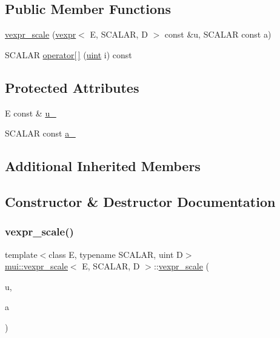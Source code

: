 \subsection*{Public Member Functions}
\begin{DoxyCompactItemize}
\item 
\hyperlink{structmui_1_1vexpr__scale_a4d10acba01d51494bbc974f0444f6ae1}{vexpr\+\_\+scale} (\hyperlink{structmui_1_1vexpr}{vexpr}$<$ E, S\+C\+A\+L\+AR, D $>$ const \&u, S\+C\+A\+L\+AR const a)
\item 
S\+C\+A\+L\+AR \hyperlink{structmui_1_1vexpr__scale_af70986a40768a6a59439df491c6942a1}{operator\mbox{[}$\,$\mbox{]}} (\hyperlink{namespacemui_af15a3e7188a2117fb9965277bb0cacd2}{uint} i) const
\end{DoxyCompactItemize}
\subsection*{Protected Attributes}
\begin{DoxyCompactItemize}
\item 
E const  \& \hyperlink{structmui_1_1vexpr__scale_a7c0ca192334d9cafc190dd8f37324886}{u\+\_\+}
\item 
S\+C\+A\+L\+AR const \hyperlink{structmui_1_1vexpr__scale_a4a36269f005da6db6f0268ac27d0b7a7}{a\+\_\+}
\end{DoxyCompactItemize}
\subsection*{Additional Inherited Members}


\subsection{Constructor \& Destructor Documentation}
\mbox{\label{structmui_1_1vexpr__scale_a4d10acba01d51494bbc974f0444f6ae1}} 
\subsubsection{\texorpdfstring{vexpr\+\_\+scale()}{vexpr\_scale()}}
{\footnotesize\ttfamily template$<$class E, typename S\+C\+A\+L\+AR, uint D$>$ \\
\hyperlink{structmui_1_1vexpr__scale}{mui\+::vexpr\+\_\+scale}$<$ E, S\+C\+A\+L\+AR, D $>$\+::\hyperlink{structmui_1_1vexpr__scale}{vexpr\+\_\+scale} (\begin{DoxyParamCaption}\item[{\hyperlink{structmui_1_1vexpr}{vexpr}$<$ E, S\+C\+A\+L\+AR, D $>$ const \&}]{u,  }\item[{S\+C\+A\+L\+AR const}]{a }\end{DoxyParamCaption})\hspace{0.3cm}{\ttfamily [inline]}}



